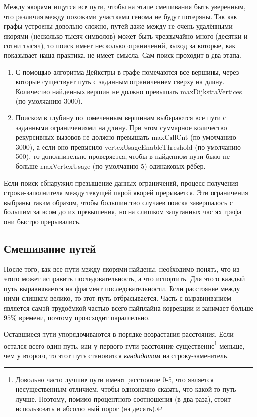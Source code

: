 \documentclass[14pt]{matmex-diploma-custom}
\begin{document}
Между якорями ищутся все пути, чтобы на этапе смешивания быть уверенным, что различия между похожими участками генома не будут потеряны. Так как графы устроены довольно сложно, путей даже между не очень удалёнными якорями (несколько тысяч символов) может быть чрезвычайно много (десятки и сотни тысяч), то поиск имеет несколько ограничений, выход за которые, как показывает наша практика, не имеет смысла. Сам поиск проходит в два этапа.
\begin{enumerate}
    \item С помощью алгоритма Дейкстры в графе помечаются все вершины, через которые существует путь с заданным ограничением сверху на длину. Количество найденных вершин не должно превышать maxDijkstraVertices (по умолчанию 3000).
    \item \begin{sloppypar}Поиском в глубину по помеченным вершинам выбираются все пути с заданными ограничениями на длину. При этом суммарное количество рекурсивных вызовов не должно превышать maxCallCnt (по умолчанию 3000), а если оно превысило vertexUsageEnableThreshold (по умолчанию 500), то дополнительно проверяется, чтобы в найденном пути было не больше maxVertexUsage (по умолчанию 5) одинаковых рёбер.\end{sloppypar}
\end{enumerate}
Если поиск обнаружил превышение данных ограничений, процесс получения строки-заполнителя между текущей парой якорей прерывается. Эти ограничения выбраны таким образом, чтобы большинство случаев поиска завершалось с большим запасом до их превышения, но на слишком запутанных частях графа они быстро прерывались.

\subsection{Смешивание путей}
После того, как все пути между якорями найдены, необходимо понять, что из этого может исправить последовательность, а что испортить. 
Для этого каждый путь выравнивается на фрагмент последовательности. Если расстояние между ними слишком велико, то этот путь отбрасывается. Часть с выравниванием является самой трудоёмкой частью всего пайплайна коррекции и занимает больше $95\%$ времени, поэтому происходит параллельно.

Оставшиеся пути упорядочиваются в порядке возрастания расстояния. Если остался всего один путь, или у первого пути расстояние существенно\footnote{Довольно часто лучшие пути имеют расстояние 0-5, что является несущественным отличием, чтобы однозначно сказать, что какой-то путь лучше. Поэтому, помимо процентного соотношения (в два раза), стоит использовать и абсолютный порог (на десять).} меньше, чем у второго, то этот путь становится \textit{кандидатом} на строку-заменитель.
\end{document}
